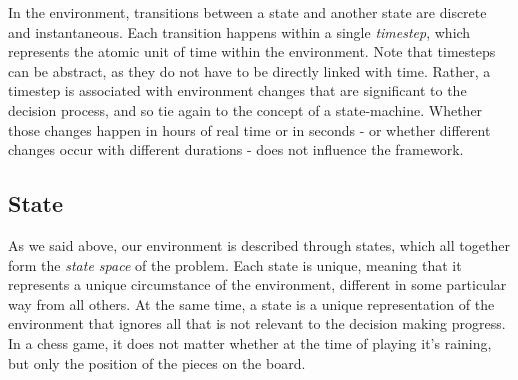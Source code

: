 In the environment, transitions between a state and another state are discrete and instantaneous.
Each transition happens within a single \textit{timestep}, which represents the atomic unit of time
within the environment. Note that timesteps can be abstract, as they do not have to be directly
linked with time. Rather, a timestep is associated with environment changes that are significant to
the decision process, and so tie again to the concept of a state-machine. Whether those changes
happen in hours of real time or in seconds - or whether different changes occur with different
durations - does not influence the framework.

%

\subsection{State}

As we said above, our environment is described through states, which all together form the
\textit{state space} of the problem. Each state is unique, meaning that it represents a unique
circumstance of the environment, different in some particular way from all others. At the same time,
a state is a unique representation of the environment that ignores all that is not relevant to the
decision making progress. In a chess game, it does not matter whether at the time of playing it's
raining, but only the position of the pieces on the board.

